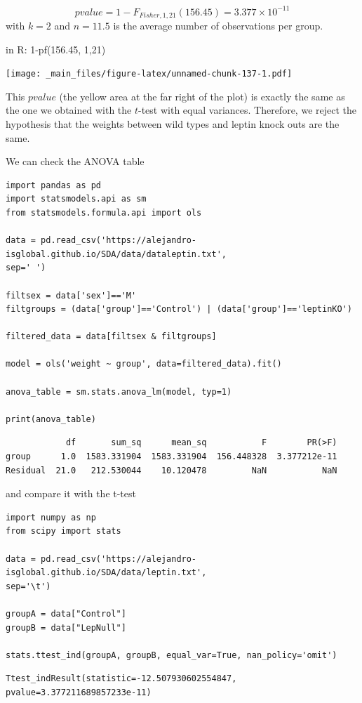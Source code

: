 \documentclass[
]{book}
\begin{document}
\[pvalue=1-F_{Fisher,1,21}(156.45)=3.377 \times 10^{-11}\] with \(k=2\) and \(n=11.5\) is the average number of observations per group.

in R: 1-pf(156.45, 1,21)

\texttt{[image: \_main\_files/figure-latex/unnamed-chunk-137-1.pdf]}

This \(pvalue\) (the yellow area at the far right of the plot) is exactly the same as the one we obtained with the \(t\)-test with equal variances. Therefore, we reject the hypothesis that the weights between wild types and leptin knock outs are the same.

We can check the ANOVA table

\begin{verbatim}
import pandas as pd
import statsmodels.api as sm
from statsmodels.formula.api import ols

data = pd.read_csv('https://alejandro-isglobal.github.io/SDA/data/dataleptin.txt', 
sep=' ')

filtsex = data['sex']=='M'
filtgroups = (data['group']=='Control') | (data['group']=='leptinKO')

filtered_data = data[filtsex & filtgroups]

model = ols('weight ~ group', data=filtered_data).fit()

anova_table = sm.stats.anova_lm(model, typ=1)

print(anova_table)
\end{verbatim}

\begin{verbatim}
            df       sum_sq      mean_sq           F        PR(>F)
group      1.0  1583.331904  1583.331904  156.448328  3.377212e-11
Residual  21.0   212.530044    10.120478         NaN           NaN
\end{verbatim}

and compare it with the t-test

\begin{verbatim}
import numpy as np
from scipy import stats

data = pd.read_csv('https://alejandro-isglobal.github.io/SDA/data/leptin.txt', 
sep='\t')

groupA = data["Control"]
groupB = data["LepNull"]

stats.ttest_ind(groupA, groupB, equal_var=True, nan_policy='omit')
\end{verbatim}

\begin{verbatim}
Ttest_indResult(statistic=-12.507930602554847, pvalue=3.377211689857233e-11)
\end{verbatim}
\end{document}
